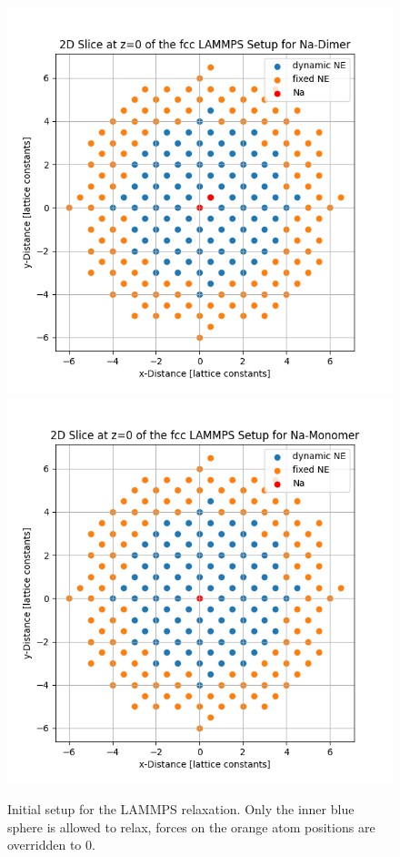 \begin{figure}[h!]
	\centering
	\includegraphics[scale=0.45]{Inhalt/Bilder/lammps_dimer_setup.png}
	\includegraphics[scale=0.45]{Inhalt/Bilder/lammps_mono_setup.png}
	\caption{Initial setup for the \ac{LAMMPS} relaxation. Only the inner blue sphere is allowed to relax, forces on the orange atom positions are overridden to 0.}
	\label{fig:lammpssetup}
\end{figure}\\
